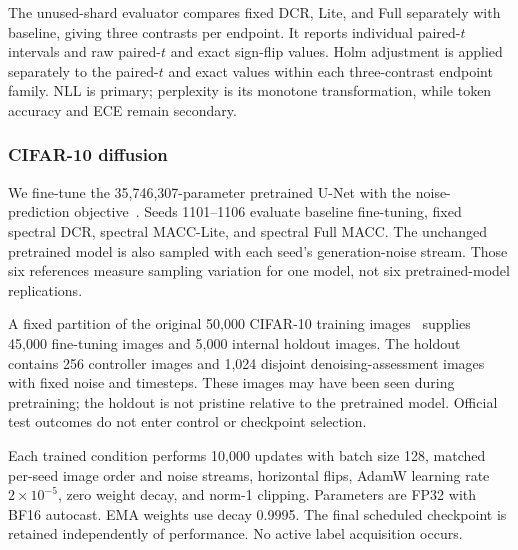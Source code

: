 \documentclass[a4paper,fleqn]{cas-dc}
\begin{document}
The unused-shard evaluator compares fixed DCR, Lite, and Full separately
with baseline, giving three contrasts per endpoint. It reports individual
paired-$t$ intervals and raw paired-$t$ and exact sign-flip values.
Holm adjustment is applied separately to the paired-$t$ and exact
values within each three-contrast endpoint family. NLL is primary; perplexity is its
monotone transformation, while token accuracy and ECE remain secondary.


\subsubsection{CIFAR-10 diffusion}
\label{sec:diffusion_setup}

We fine-tune the 35,746,307-parameter pretrained
 U-Net with the noise-prediction
objective~\cite{ho2020denoising}.
Seeds 1101--1106 evaluate baseline fine-tuning, fixed spectral
DCR, spectral MACC-Lite, and spectral Full MACC.
The unchanged pretrained model is also sampled with each seed's
generation-noise stream. Those six references measure sampling
variation for one model, not six pretrained-model replications.

A fixed partition of the original 50,000 CIFAR-10 training
images~\cite{krizhevsky2009cifar}
supplies 45,000 fine-tuning images and 5,000 internal holdout
images. The holdout contains 256 controller images and
1,024 disjoint denoising-assessment images with fixed noise
and timesteps. These images may have been seen during
pretraining; the holdout is not pristine relative to the
pretrained model. Official test outcomes do not enter control
or checkpoint selection.

Each trained condition performs 10,000 updates with batch size
128, matched per-seed image order and noise streams,
horizontal flips, AdamW learning rate $2\times10^{-5}$,
zero weight decay, and norm-1 clipping.
Parameters are FP32 with BF16 autocast.
EMA weights use decay 0.9995.
The final scheduled checkpoint is retained independently of
performance. No active label acquisition occurs.
\end{document}
